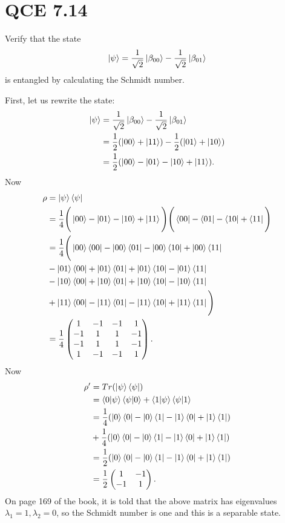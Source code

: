 \documentclass[10pt]{article}
\begin{document}
\section*{QCE 7.14}
Verify that the state
\[
\ket{\psi} = \frac{1}{\sqrt{2}} \ket{\beta_{00}} - \frac{1}{\sqrt{2}} \ket{\beta_{01}}
\]
is entangled by calculating the Schmidt number.

First, let us rewrite the state:
\begin{align*}
\ket{\psi} &= \frac{1}{\sqrt{2}} \ket{\beta_{00}} - \frac{1}{\sqrt{2}} \ket{\beta_{01}} \\
                &= \frac{1}{2} (\ket{00} + \ket{11}) - \frac{1}{2} (\ket{01} + \ket{10}) \\
                &= \frac{1}{2} (\ket{00} - \ket{01} - \ket{10} + \ket{11}).
\end{align*}
Now
\begin{align*}
\rho &= \ket{\psi} \bra{\psi} \\
        &= \frac{1}{4} \Bigg( \ket{00} - \ket{01} - \ket{10} + \ket{11} \Bigg) \Bigg( \bra{00} - \bra{01} - \bra{10} + \bra{11} \Bigg) \\
        &= \frac{1}{4} \Bigg( \ket{00} \bra{00} -  \ket{00} \bra{01} - \ket{00} \bra{10} +  \ket{00} \bra{11} \\
        &-  \ket{01} \bra{00} +  \ket{01} \bra{01} +  \ket{01} \bra{10} - \ket{01} \bra{11} \\ 
        &-  \ket{10} \bra{00} +  \ket{10} \bra{01} +  \ket{10} \bra{10} -  \ket{10} \bra{11} \\
        &+  \ket{11} \bra{00} -  \ket{11} \bra{01} - \ket{11} \bra{10} +  \ket{11} \bra{11} \Bigg) \\
        &= 
        \frac{1}{4}
        \begin{pmatrix}
        1 & -1 & -1 & 1 \\
        -1 & 1 & 1 & -1 \\
        -1 & 1 & 1 & -1 \\
        1 & -1 & -1 & 1
        \end{pmatrix}.
\end{align*}
Now
\begin{align*}
\rho' &= Tr(\ket{\psi} \bra{\psi}) \\
         &= \braket{0|\psi} \braket{\psi|0} + \braket{1|\psi} \braket{\psi|1} \\
         &= \frac{1}{4} ( \ket{0} \bra{0} - \ket{0} \bra{1} - \ket{1} \bra{0} +\ket{1} \bra{1} ) \\
         &+ \frac{1}{4} ( \ket{0} \bra{0} - \ket{0} \bra{1} - \ket{1} \bra{0} + \ket{1} \bra{1} ) \\
         &= \frac{1}{2} (\ket{0} \bra{0} - \ket{0} \bra{1} - \ket{1} \bra{0} + \ket{1} \bra{1}) \\
         &= 
         \frac{1}{2}
         \begin{pmatrix}
         1 & - 1 \\
         -1 & 1 
         \end{pmatrix}.
\end{align*}
On page 169 of the book, it is told that the above matrix has eigenvalues $\lambda_1 = 1, \lambda_2 = 0$, so the Schmidt number is one and this is a separable state.
\end{document}
